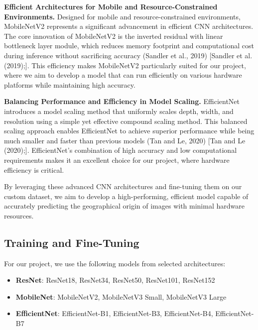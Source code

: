 \textbf{Efficient Architectures for Mobile and Resource-Constrained
Environments.} Designed for mobile and resource-constrained
environments, MobileNetV2 represents a significant advancement in
efficient CNN architectures. The core innovation of MobileNetV2 is the
inverted residual with linear bottleneck layer module, which reduces
memory footprint and computational cost during inference without
sacrificing accuracy (Sandler et al., 2019) {[}Sandler et al.
(2019);{]}. This efficiency makes MobileNetV2 particularly suited for
our project, where we aim to develop a model that can run efficiently on
various hardware platforms while maintaining high accuracy.

\textbf{Balancing Performance and Efficiency in Model Scaling.}
EfficientNet introduces a model scaling method that uniformly scales
depth, width, and resolution using a simple yet effective compound
scaling method. This balanced scaling approach enables EfficientNet to
achieve superior performance while being much smaller and faster than
previous models (Tan and Le, 2020) {[}Tan and Le (2020);{]}.
EfficientNet's combination of high accuracy and low computational
requirements makes it an excellent choice for our project, where
hardware efficiency is critical.

By leveraging these advanced CNN architectures and fine-tuning them on
our custom dataset, we aim to develop a high-performing, efficient model
capable of accurately predicting the geographical origin of images with
minimal hardware resources.

\subsection{Training and Fine-Tuning}\label{training-and-fine-tuning}

For our project, we use the following models from selected
architectures:

\begin{itemize}
\tightlist
\item
  \textbf{ResNet}: ResNet18, ResNet34, ResNet50, ResNet101, ResNet152
\item
  \textbf{MobileNet}: MobileNetV2, MobileNetV3 Small, MobileNetV3 Large
\item
  \textbf{EfficientNet}: EfficientNet-B1, EfficientNet-B3,
  EfficientNet-B4, EfficientNet-B7
\end{itemize}

